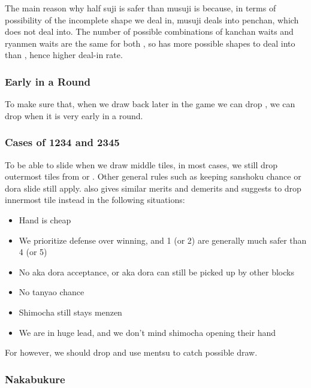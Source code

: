 \documentclass[12pt]{article}
\begin{document}
The main reason why half suji is safer than musuji is because, in terms of possibility of the incomplete shape we deal in, musuji  deals into  penchan, which  does not deal into. The number of possible combinations of kanchan waits and ryanmen waits are the same for both , so  has more possible shapes to deal into than , hence higher deal-in rate.


\subsubsection*{Early in a Round}

To make sure that, when we draw  back later in the game we can drop , we can drop  when it is very early in a round.

\subsubsection*{Cases of 1234 and 2345}

To be able to slide when we draw middle tiles, in most cases, we still drop outermost tiles from  or . Other general rules such as keeping sanshoku chance or dora slide still apply. \citet[pp.~171--172]{kawamura-naki} also gives similar merits and demerits and suggests to drop innermost tile instead in the following situations:

\begin{itemize}
\item Hand is cheap
\item We prioritize defense over winning, and 1 (or 2) are generally much safer than 4 (or 5)
\item No aka dora acceptance, or aka dora can still be picked up by other blocks
\item No tanyao chance
\item Shimocha still stays menzen
\item We are in huge lead, and we don't mind shimocha opening their hand
\end{itemize}

For  however, we should drop  and use  mentsu to catch possible  draw.


\subsubsection{Nakabukure} \label{subsub:nakabukure}
\end{document}
